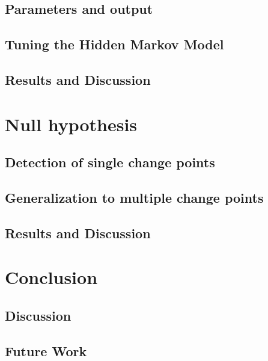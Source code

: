 \documentclass{kththesis}
\begin{document}
\section{Parameters and output}

\section{Tuning the Hidden Markov Model}

\section{Results and Discussion}


\chapter{Null hypothesis}

\section{Detection of single change points}

\section{Generalization to multiple change points}

\section{Results and Discussion}


\chapter{Conclusion}

\section{Discussion}

\section{Future Work}

\printbibliography[heading=bibintoc]
\end{document}
